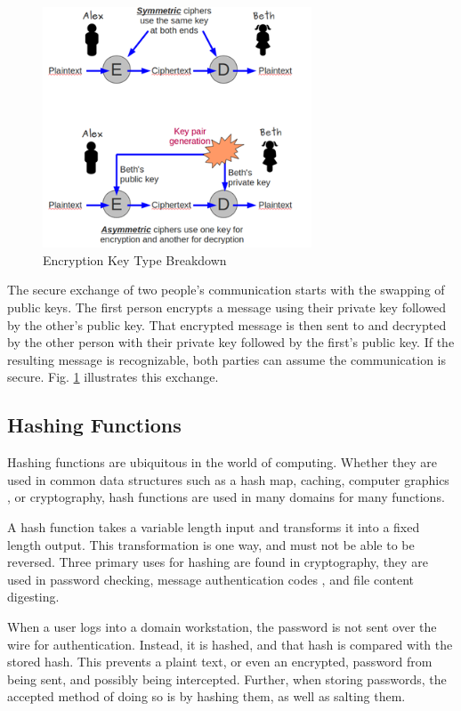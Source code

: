 \documentclass[journal]{IEEEtran}
\begin{document}
\begin{figure}[htbp]
	\centering
	\includegraphics[width=8cm,keepaspectratio]{img/encryptionkeytypes.png}
	\caption{Encryption Key Type Breakdown \cite{KeyFigure} }
	\label{keytypes}
\end{figure}

The secure exchange of two people's communication starts with the swapping of public keys.  The first person encrypts a message using their private key followed by the other's public key.  That encrypted message is then sent to and decrypted by the other person with their private key followed by the first's public key.  If the resulting message is recognizable, both parties can assume the communication is secure.  Fig. \ref{keytypes} illustrates this exchange.


\subsection{Hashing Functions}

Hashing functions are ubiquitous in the world of computing.  Whether they are used in common data structures such as a hash map, caching, computer graphics \cite{gpu}, or cryptography, hash functions are used in many domains for many functions.  

A hash function takes a variable length input and transforms it into a fixed length output.  This transformation is one way, and must not be able to be reversed.  Three primary uses for hashing are found in cryptography, they are used in password checking, message authentication codes \cite{hash}, and file content digesting.

When a user logs into a domain workstation, the password is not sent over the wire for authentication.  Instead, it is hashed, and that hash is compared with the stored hash.  This prevents a plaint text, or even an encrypted, password from being sent, and possibly being intercepted.  Further, when storing passwords, the accepted method of doing so is by hashing them, as well as salting them. 
\end{document}
